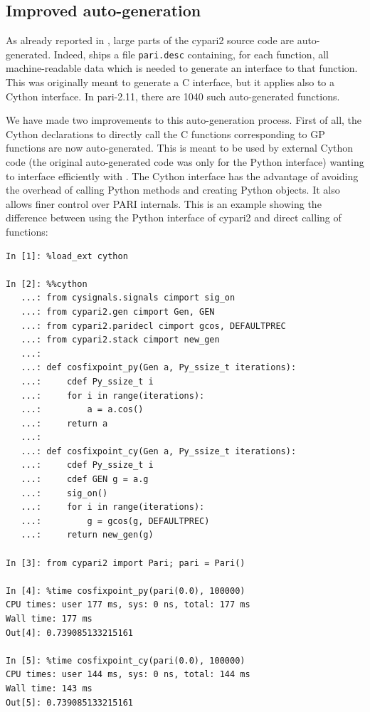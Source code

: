 \documentclass{deliverablereport}
\begin{document}
\subsection{Improved auto-generation}

As already reported in ,
large parts of the cypari2 source code are auto-generated.
Indeed, \Pari ships a file \verb/pari.desc/ containing,
for each function, all machine-readable data which is needed to generate
an interface to that function.
This was originally meant to generate a C interface,
but it applies also to a Cython interface.
In pari-2.11, there are 1040 such auto-generated functions.

We have made two improvements to this auto-generation process.
First of all,
the Cython declarations to directly call the C functions
corresponding to GP functions are now auto-generated.
This is meant to be used by external Cython code
(the original auto-generated code was only for the Python interface)
wanting to interface efficiently with \Pari.
The Cython interface has the advantage of avoiding the
overhead of calling Python methods and creating Python objects.
It also allows finer control over PARI internals.
This is an example showing the difference between using
the Python interface of cypari2 and direct calling of \Pari
functions:
\begin{verbatim}
In [1]: %load_ext cython

In [2]: %%cython
   ...: from cysignals.signals cimport sig_on
   ...: from cypari2.gen cimport Gen, GEN
   ...: from cypari2.paridecl cimport gcos, DEFAULTPREC
   ...: from cypari2.stack cimport new_gen
   ...:
   ...: def cosfixpoint_py(Gen a, Py_ssize_t iterations):
   ...:     cdef Py_ssize_t i
   ...:     for i in range(iterations):
   ...:         a = a.cos()
   ...:     return a
   ...:
   ...: def cosfixpoint_cy(Gen a, Py_ssize_t iterations):
   ...:     cdef Py_ssize_t i
   ...:     cdef GEN g = a.g
   ...:     sig_on()
   ...:     for i in range(iterations):
   ...:         g = gcos(g, DEFAULTPREC)
   ...:     return new_gen(g)

In [3]: from cypari2 import Pari; pari = Pari()

In [4]: %time cosfixpoint_py(pari(0.0), 100000)
CPU times: user 177 ms, sys: 0 ns, total: 177 ms
Wall time: 177 ms
Out[4]: 0.739085133215161

In [5]: %time cosfixpoint_cy(pari(0.0), 100000)
CPU times: user 144 ms, sys: 0 ns, total: 144 ms
Wall time: 143 ms
Out[5]: 0.739085133215161
\end{verbatim}
\end{document}
